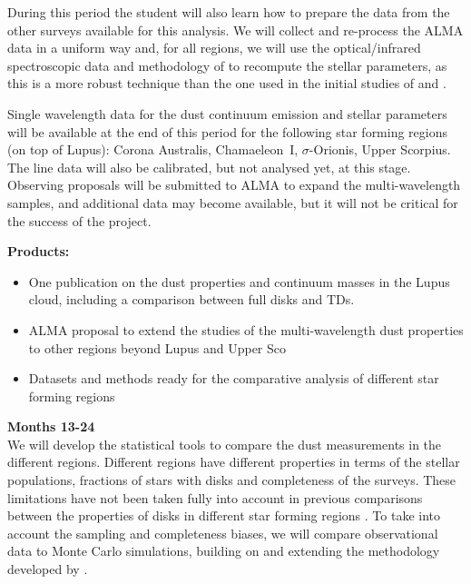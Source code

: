 \documentclass[10pt,fleqn,twoside]{article}
\begin{document}
During this period the student will also learn how to prepare the data from the other surveys available for this analysis. 
We will collect and re-process the ALMA data in a uniform way and, for all regions, we will use the optical/infrared spectroscopic data and methodology of \citet{2016ApJ...831..125P} to recompute the stellar parameters, as this is a more robust 
technique than the one used in the initial studies of \citet{2016ApJ...828...46A} and \citet{2016ApJ...827..142B}.

Single wavelength data for the dust continuum emission and stellar parameters will be available at the end of this period for the following star forming regions (on top of Lupus): Corona Australis, Chamaeleon~I, $\sigma$-Orionis, Upper Scorpius. The line data will also be calibrated, but not analysed yet, at this stage. Observing proposals will be submitted to ALMA to expand the multi-wavelength samples, and additional data may become available, but it will not be critical for the success of the project.

\smallskip
{\bf Products:} 
\begin{itemize}
\item One publication on the dust properties and continuum masses in the Lupus cloud, including a comparison between full disks and TDs.
\item ALMA proposal to extend the studies of the multi-wavelength dust properties to other regions beyond Lupus and Upper Sco
\item Datasets and methods ready for the comparative analysis of different star forming regions
\end{itemize}

{\Tcol\bf Months 13-24}\\

We will develop the statistical tools to compare the dust measurements in the different regions.
Different regions have different properties in terms of the stellar populations, fractions of stars with disks and completeness of the surveys. These limitations have not been taken fully into account in previous 
comparisons between the properties of disks in different star forming regions \citep[e.g.\ ][]{2016ApJ...828...46A,2016ApJ...831..125P}. To take into account the sampling and completeness biases, we will compare observational data to Monte Carlo simulations, building on and extending the methodology developed by \citet{2013ApJ...771..129A}. 
\end{document}
